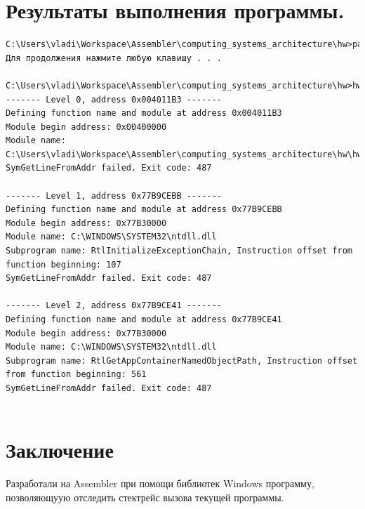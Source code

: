 \documentclass[a4paper,14pt]{extarticle}
\begin{document}
\section{Результаты выполнения программы.}
\begin{verbatim}
C:\Users\vladi\Workspace\Assembler\computing_systems_architecture\hw>pause
Для продолжения нажмите любую клавишу . . .

C:\Users\vladi\Workspace\Assembler\computing_systems_architecture\hw>hw.exe
------- Level 0, address 0x004011B3 ------- 
Defining function name and module at address 0x004011B3
Module begin address: 0x00400000
Module name: C:\Users\vladi\Workspace\Assembler\computing_systems_architecture\hw\hw.exe
SymGetLineFromAddr failed. Exit code: 487

------- Level 1, address 0x77B9CEBB -------
Defining function name and module at address 0x77B9CEBB
Module begin address: 0x77B30000
Module name: C:\WINDOWS\SYSTEM32\ntdll.dll
Subprogram name: RtlInitializeExceptionChain, Instruction offset from function beginning: 107
SymGetLineFromAddr failed. Exit code: 487

------- Level 2, address 0x77B9CE41 -------
Defining function name and module at address 0x77B9CE41
Module begin address: 0x77B30000
Module name: C:\WINDOWS\SYSTEM32\ntdll.dll
Subprogram name: RtlGetAppContainerNamedObjectPath, Instruction offset from function beginning: 561
SymGetLineFromAddr failed. Exit code: 487


\end{verbatim}

\section{Заключение}
Разработали на Assembler при помощи библиотек Windows
программу, позволяющуую отследить стектрейс вызова текущей программы.
\end{document}
